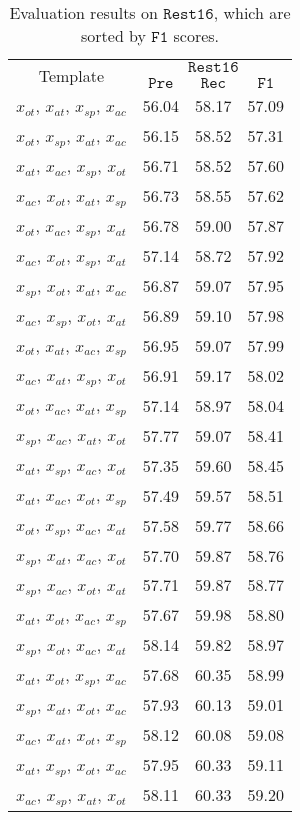 \documentclass[11pt]{article}
\begin{document}
\begin{table}[]
\small
    \centering
    \begin{tabular}{c|ccc}
    \toprule
    \multirow{2}{*}{Template} & \multicolumn{3}{c}{$\mathtt{Rest16}$} \\ 
    & $\mathtt{Pre}$ & $\mathtt{Rec}$ & $\mathtt{F1}$ \\
    \midrule
$x_{ot}$, $x_{at}$, $x_{sp}$, $x_{ac}$ & 56.04 & 58.17 & 57.09 \\
$x_{ot}$, $x_{sp}$, $x_{at}$, $x_{ac}$ & 56.15 & 58.52 & 57.31 \\
$x_{at}$, $x_{ac}$, $x_{sp}$, $x_{ot}$ & 56.71 & 58.52 & 57.60 \\
$x_{ac}$, $x_{ot}$, $x_{at}$, $x_{sp}$ & 56.73 & 58.55 & 57.62 \\
$x_{ot}$, $x_{ac}$, $x_{sp}$, $x_{at}$ & 56.78 & 59.00 & 57.87 \\
$x_{ac}$, $x_{ot}$, $x_{sp}$, $x_{at}$ & 57.14 & 58.72 & 57.92 \\
$x_{sp}$, $x_{ot}$, $x_{at}$, $x_{ac}$ & 56.87 & 59.07 & 57.95 \\
$x_{ac}$, $x_{sp}$, $x_{ot}$, $x_{at}$ & 56.89 & 59.10 & 57.98 \\
$x_{ot}$, $x_{at}$, $x_{ac}$, $x_{sp}$ & 56.95 & 59.07 & 57.99 \\
$x_{ac}$, $x_{at}$, $x_{sp}$, $x_{ot}$ & 56.91 & 59.17 & 58.02 \\
$x_{ot}$, $x_{ac}$, $x_{at}$, $x_{sp}$ & 57.14 & 58.97 & 58.04 \\
$x_{sp}$, $x_{ac}$, $x_{at}$, $x_{ot}$ & 57.77 & 59.07 & 58.41 \\
$x_{at}$, $x_{sp}$, $x_{ac}$, $x_{ot}$ & 57.35 & 59.60 & 58.45 \\
$x_{at}$, $x_{ac}$, $x_{ot}$, $x_{sp}$ & 57.49 & 59.57 & 58.51 \\
$x_{ot}$, $x_{sp}$, $x_{ac}$, $x_{at}$ & 57.58 & 59.77 & 58.66 \\
$x_{sp}$, $x_{at}$, $x_{ac}$, $x_{ot}$ & 57.70 & 59.87 & 58.76 \\
$x_{sp}$, $x_{ac}$, $x_{ot}$, $x_{at}$ & 57.71 & 59.87 & 58.77 \\
$x_{at}$, $x_{ot}$, $x_{ac}$, $x_{sp}$ & 57.67 & 59.98 & 58.80 \\
$x_{sp}$, $x_{ot}$, $x_{ac}$, $x_{at}$ & 58.14 & 59.82 & 58.97 \\
$x_{at}$, $x_{ot}$, $x_{sp}$, $x_{ac}$ & 57.68 & 60.35 & 58.99 \\
$x_{sp}$, $x_{at}$, $x_{ot}$, $x_{ac}$ & 57.93 & 60.13 & 59.01 \\
$x_{ac}$, $x_{at}$, $x_{ot}$, $x_{sp}$ & 58.12 & 60.08 & 59.08 \\
$x_{at}$, $x_{sp}$, $x_{ot}$, $x_{ac}$ & 57.95 & 60.33 & 59.11 \\
$x_{ac}$, $x_{sp}$, $x_{at}$, $x_{ot}$ & 58.11 & 60.33 & 59.20 \\
\bottomrule
    \end{tabular}
    \caption{Evaluation results on $\mathtt{Rest16}$, which are sorted by $\mathtt{F1}$ scores.}
    \label{table:rest16_appendix_without_marker}
\end{table}
\end{document}

